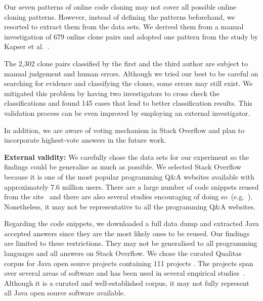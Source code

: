 \documentclass[10pt,journal,compsoc]{IEEEtran}
\begin{document}


Our seven patterns of online code cloning may not cover all possible online
cloning patterns. However, instead of defining the patterns beforehand, we
resorted to extract them from the data sets. We derived them from a manual
investigation of 679 online clone pairs and adopted one pattern from the study
by Kapser et al.~\cite{Kapser2003}.

The 2,302 clone pairs classified by the first and the third author are subject
to manual judgement and human errors.  Although we tried our best to be careful
on searching for evidence and classifying the clones, some errors may still
exist. We mitigated this problem by having two investigators to cross check the
classifications and found 145 cases that lead to better classification results.
This validation process can be even improved by employing an external
investigator. 

In addition, we are aware of voting mechanism in Stack Overflow and plan to
incorporate highest-vote answers in the future work.

\textbf{External validity:} We carefully chose the data sets for our
experiment so the findings could be generalise as much as possible.
We selected Stack Overflow because it is one of the most popular
programming Q\&A websites available with approximately 7.6 million
users. There are a large number of code snippets reused from the
site~\cite{An2017} and there are also several studies encouraging of
doing
so~(e.g.~\cite{Ponzanelli2013,Ponzanelli2014,Keivanloo2014,Park2014}).
Nonetheless, it may not be representative to all the programming Q\&A
websites.

Regarding the code snippets, we downloaded a full data dump and
extracted Java accepted answers
since they are the
most likely ones to be reused. 
Our findings are limited to these restrictions. They may
not be generalised to all programming languages and all answers on
Stack Overflow. We chose the curated Qualitas
corpus for Java open source projects containing 111 projects
\cite{QualitasCorpus}.  The projects span over several areas of
software and has been used in several empirical
studies~\cite{Taube-Schock2011,Beckman2011,Vasilescu2011,Omar2012}. Although
it is a curated and well-established corpus, it may not fully
represent all Java open source software available.
\end{document}
